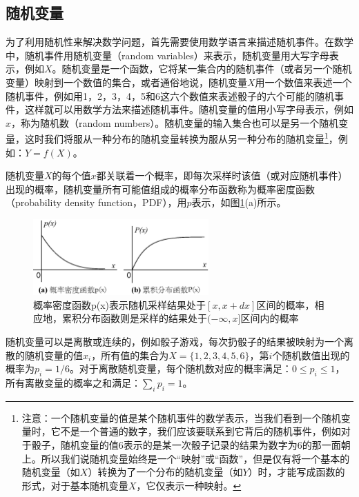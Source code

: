 \subsection{随机变量}
为了利用随机性来解决数学问题，首先需要使用数学语言来描述随机事件。在数学中，随机事件用随机变量（random variables）来表示，随机变量用大写字母表示，例如$X$。随机变量是一个函数，它将某一集合内的随机事件（或者另一个随机变量）映射到一个数值的集合，或者通俗地说，随机变量$X$用一个数值来表述一个随机事件，例如用1，2，3，4，5和6这六个数值来表述骰子的六个可能的随机事件，这样就可以用数学方法来描述随机事件。随机变量的值用小写字母表示，例如$x$，称为随机数（random numbers）。随机变量的输入集合也可以是另一个随机变量，这时我们将服从一种分布的随机变量转换为服从另一种分布的随机变量\footnote{注意：一个随机变量的值是某个随机事件的数学表示，当我们看到一个随机变量时，它不是一个普通的数字，我们应该要联系到它背后的随机事件，例如对于骰子，随机变量的值6表示的是某一次骰子记录的结果为数字为6的那一面朝上。所以我们说随机变量始终是一个“映射”或“函数”，但是仅有将一个基本的随机变量（如$X$）转换为了一个分布的随机变量（如$Y$）时，才能写成函数的形式，对于基本随机变量$X$，它仅表示一种映射。}，例如：$Y=f(X)$。

随机变量$X$的每个值$x$都关联着一个概率，即每次采样时该值（或对应随机事件）出现的概率，随机变量所有可能值组成的概率分布函数称为概率密度函数（probability density function，PDF），用$p$表示，如图\ref{f:mc-cdf}(a)所示。

\begin{figure}
	\sidecaption
	\includegraphics[width=0.6\textwidth]{figures/mc/cdf}
	\caption{概率密度函数p(x)表示随机采样结果处于$[x,x+dx]$区间的概率，相应地，累积分布函数则是采样的结果处于$(-\infty,x]$区间内的概率}
	\label{f:mc-cdf}
\end{figure}

随机变量可以是离散或连续的，例如骰子游戏，每次扔骰子的结果被映射为一个离散的随机变量的值$x_i$，所有值的集合为$X=\{1,2,3,4,5,6\}$，第$i$个随机数值出现的概率为$p_i=1/6$。对于离散随机变量，每个随机数对应的概率满足：$0\leq p_i \leq 1$，所有离散变量的概率之和满足：$\sum_i p_i=1$。


